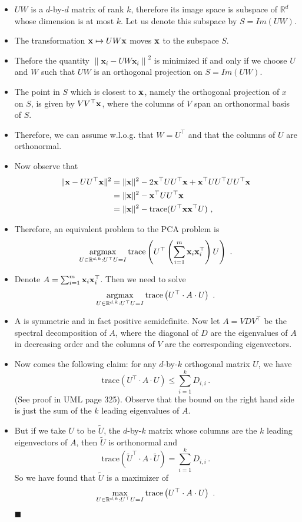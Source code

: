 \documentclass[11pt]{article}
\newcommand{\norm}[1]{\left\| #1\right\|}
\newcommand{\R}{\ensuremath{\mathbb{R}}}
\newcommand{\V}[1]{\mathbf{#1}}
\begin{document}
\begin{itemize}
  \item $UW$ is a $d$-by-$d$ matrix of rank $k$, therefore its image space 
    is subspace of $\R^d$ whose dimension is at most $k$.
    Let us denote this subspace by $S=Im(UW)$.
  \item The transformation ${\mathbf x} \mapsto UW{\mathbf x}$ moves ${\mathbf x}$ to the subspace $S$.
  \item Thefore the quantity 
    $\norm{\V{x}_i - UW\V{x}_i}^2$ is minimized if and only if we choose $U$ and
    $W$ such that $UW$ is an orthogonal projection on $S=Im(UW)$.
  \item The point in $S$ which is closest to ${\mathbf x}$, namely the orthogonal
    projection of $x$ on $S$, is given by $V V^\top {\mathbf x}$, 
    where the columns of $V$ span an orthonormal basis of $S$.
\item Therefore, we can assume w.l.o.g. that $W = U^\top$ and that 
  the columns of
  $U$ are orthonormal.
\item Now observe that 
\[
\begin{split}
\|{\mathbf x} - U U^\top {\mathbf x}\|^2 &= \|{\mathbf x}\|^2 - 2 {\mathbf x}^\top U U^\top {\mathbf x} + {\mathbf x}^\top U
U^\top U U^\top {\mathbf x} \\
&= \|{\mathbf x}\|^2 - {\mathbf x}^\top U U^\top {\mathbf x} \\
&= \|{\mathbf x}\|^2 - \mathrm{trace}(U^\top {\mathbf x} {\mathbf x}^\top U) ~,
\end{split}
\]
\item Therefore, an equivalent problem to the PCA problem is
\[
\operatorname*{argmax}_{U \in \mathbb{R}^{d,k} : U^\top U = I} \mathrm{trace}\left(U^\top
\left(\sum_{i=1}^m {\mathbf x}_i {\mathbf x}_i^\top \right) U\right) ~.
\]
\item Denote $A = \sum_{i=1}^m {\mathbf x}_i {\mathbf x}_i^\top$. Then we need to solve
\[
\operatorname*{argmax}_{U \in \mathbb{R}^{d,k} : U^\top U = I} \mathrm{trace}\left(U^\top
\cdot A \cdot U\right) ~.
\]
\item A is symmetric and in fact positive semidefinite. 
  Now let $A=VDV^\top$ be the spectral decomposition of $A$, where the diagonal
  of $D$ are the eigenvalues of $A$ in decreasing order and the columns of $V$
  are the corresponding eigenvectors. 
\item Now comes the following claim: 
  for any $d$-by-$k$ orthogonal matrix $U$, we have
  \[
 \mathrm{trace}\left(U^\top
 \cdot A \cdot U\right) \leq \sum_{i=1}^k D_{i,i}\,.
  \]
  (See proof in UML page 325). Observe that the bound on the right hand side 
  is just the sum of the $k$ leading eigenvalues of $A$.
\item But if we take $U$ to be $\tilde{U}$, the $d$-by-$k$ matrix whose columns are the $k$
  leading eigenvectors of $A$, then $\tilde{U}$ is orthonormal and 
 \[
   \mathrm{trace}\left(\tilde{U}^\top
   \cdot A \cdot \tilde{U}\right) = \sum_{i=1}^k D_{i,i}\,.
 \]
 So we have found that $\tilde{U}$ is a maximizer of \[
\max_{U \in \mathbb{R}^{d,k} : U^\top U = I} \mathrm{trace}\left(U^\top
\cdot A \cdot U\right) ~.
\]
  $\blacksquare$
\end{itemize}
\end{document}
